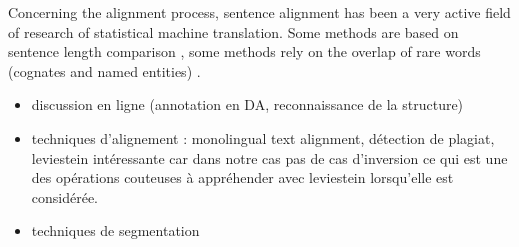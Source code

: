 Concerning the alignment process, sentence alignment has been a very active field of research of statistical machine translation. 
Some methods are based on sentence length comparison \cite{gale:1991}, some methods rely on the overlap of rare words (cognates and named entities) \cite{enright-kondrak:2007:ShortPapers}.




\begin{itemize}
\item discussion en ligne (annotation en DA, reconnaissance de la structure)
\item  techniques d'alignement : monolingual text alignment, détection de plagiat, leviestein intéressante car dans notre cas pas de cas d'inversion ce qui est une des opérations couteuses à appréhender avec leviestein lorsqu'elle est considérée.


\item  techniques de segmentation
\end{itemize}
